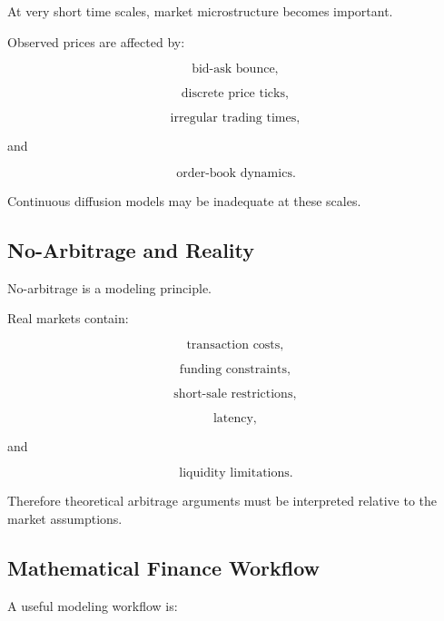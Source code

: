 At very short time scales, market microstructure becomes important.

Observed prices are affected by:

\[
\boxed{
\text{bid-ask bounce},
}
\]

\[
\boxed{
\text{discrete price ticks},
}
\]

\[
\boxed{
\text{irregular trading times},
}
\]

and

\[
\boxed{
\text{order-book dynamics}.
}
\]

Continuous diffusion models may be inadequate at these scales.

\subsection{No-Arbitrage and Reality}
\label{subsec:no-arbitrage-and-reality}

No-arbitrage is a modeling principle.

Real markets contain:

\[
\boxed{
\text{transaction costs},
}
\]

\[
\boxed{
\text{funding constraints},
}
\]

\[
\boxed{
\text{short-sale restrictions},
}
\]

\[
\boxed{
\text{latency},
}
\]

and

\[
\boxed{
\text{liquidity limitations}.
}
\]

Therefore theoretical arbitrage arguments must be interpreted relative to
the market assumptions.

\subsection{Mathematical Finance Workflow}
\label{subsec:mathematical-finance-workflow}

A useful modeling workflow is:

